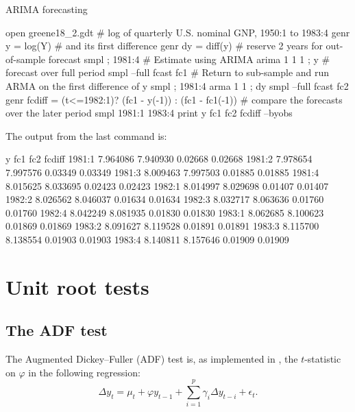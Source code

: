 \begin{script}[htbp]
  \caption{ARIMA forecasting}
  \label{arima-fcast-script}
\begin{scode}
open greene18_2.gdt
# log of quarterly U.S. nominal GNP, 1950:1 to 1983:4
genr y = log(Y)
# and its first difference
genr dy = diff(y)
# reserve 2 years for out-of-sample forecast
smpl ; 1981:4
# Estimate using ARIMA
arima 1 1 1 ; y 
# forecast over full period
smpl --full
fcast fc1
# Return to sub-sample and run ARMA on the first difference of y
smpl ; 1981:4
arma 1 1 ; dy
smpl --full
fcast fc2
genr fcdiff = (t<=1982:1)? (fc1 - y(-1)) : (fc1 - fc1(-1))
# compare the forecasts over the later period
smpl 1981:1 1983:4
print y fc1 fc2 fcdiff --byobs
\end{scode}
The output from the last command is:
%
\begin{code}
                  y          fc1          fc2       fcdiff
1981:1      7.964086     7.940930      0.02668      0.02668
1981:2      7.978654     7.997576      0.03349      0.03349
1981:3      8.009463     7.997503      0.01885      0.01885
1981:4      8.015625     8.033695      0.02423      0.02423
1982:1      8.014997     8.029698      0.01407      0.01407
1982:2      8.026562     8.046037      0.01634      0.01634
1982:3      8.032717     8.063636      0.01760      0.01760
1982:4      8.042249     8.081935      0.01830      0.01830
1983:1      8.062685     8.100623      0.01869      0.01869
1983:2      8.091627     8.119528      0.01891      0.01891
1983:3      8.115700     8.138554      0.01903      0.01903
1983:4      8.140811     8.157646      0.01909      0.01909
\end{code}
\end{script}


\section{Unit root tests}
\label{sec:uroot}

\subsection{The ADF test}
\label{sec:ADFtest}

The Augmented Dickey--Fuller (ADF) test is, as implemented in
, the $t$-statistic on $\varphi$ in the following regression:
\begin{equation}
  \label{eq:ADFtest}
  \Delta y_t = \mu_t + \varphi y_{t-1} + \sum_{i=1}^p \gamma_i \Delta
  y_{t-i} + \epsilon_t .
\end{equation}

